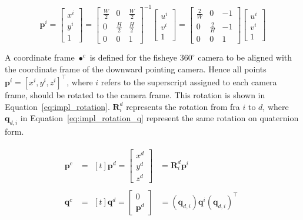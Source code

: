 \begin{equation}
    \mathbf{p}^i = \begin{bmatrix}
        x^i \\ y^i \\ 1
    \end{bmatrix} = \begin{bmatrix}
        \frac{W}{2} & 0 & \frac{W}{2} \\
        0 & \frac{H}{2} & \frac{H}{2} \\
        0 & 0 & 1
    \end{bmatrix}^{-1}\begin{bmatrix}
        u^i \\ v^i \\ 1
    \end{bmatrix} = \begin{bmatrix}
        \frac{2}{W} & 0 & -1 \\
        0 & \frac{2}{H} & -1 \\
        0 & 0 & 1
    \end{bmatrix}\begin{bmatrix}
        u^i \\ v^i \\ 1
    \end{bmatrix}
    \label{eq:impl_pixel_inverse_transform}
\end{equation}

A coordinate frame $\bullet^c$ is defined for the fisheye $360^\circ$ camera to be aligned with the coordinate frame of the downward pointing camera. Hence all points $\mathbf{p}^i = [x^i,y^i,z^i]^\top$, where $i$ refers to the superscript assigned to each camera frame, should be rotated to the camera frame. This rotation is shown in Equation~\eqref{eq:impl_rotation}. $\mathbf{R}^d_i$ represents the rotation from fra $i$ to $d$, where $\mathbf{q}_{d,i}$ in Equation~\eqref{eq:impl_rotation_q} represent the same rotation on quaternion form.

\begin{subequations}
    \begin{align}
        \mathbf{p}^c &= \!\begin{aligned}[t]
            \mathbf{p}^d = \begin{bmatrix} x^d \\ y^d \\ z^d \end{bmatrix} &= \mathbf{R}^d_i \mathbf{p}^i
        \end{aligned} \label{eq:impl_rotation_R} \\[0.75ex]
        \mathbf{q}^c &= \!\begin{aligned}[t]
            \mathbf{q}^d = \begin{bmatrix} 0 \\ \mathbf{p}^d \end{bmatrix} &= (\mathbf{q}_{d,i})\mathbf{q}^i(\mathbf{q}_{d,i})^\top
        \end{aligned} \label{eq:impl_rotation_q}
    \end{align}
    \label{eq:impl_rotation}
\end{subequations}

